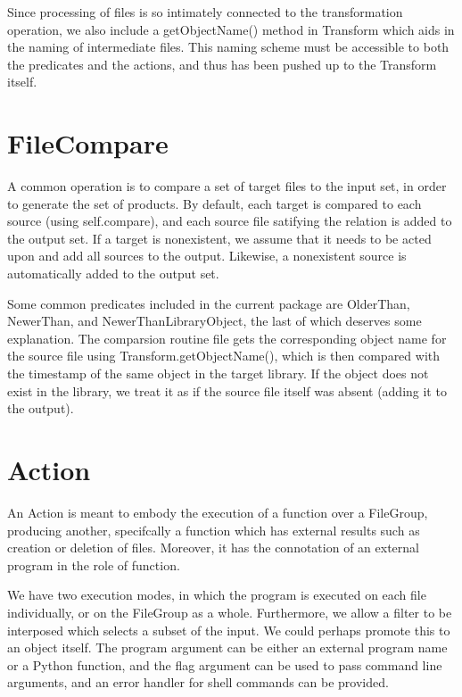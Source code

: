 Since processing of files is so intimately connected to the transformation operation, we also include a getObjectName()
method in Transform which aids in the naming of intermediate files. This naming scheme must be accessible to both the
predicates and the actions, and thus has been pushed up to the Transform itself.

\section{FileCompare}

A common operation is to compare a set of target files to the input set, in order to generate the set of products. By
default, each target is compared to each source (using self.compare), and each source file satifying the relation is
added to the output set. If a target is nonexistent, we assume that it needs to be acted upon and add all sources to the
output. Likewise, a nonexistent source is automatically added to the output set.

Some common predicates included in the current package are OlderThan, NewerThan, and NewerThanLibraryObject, the last of
which deserves some explanation. The comparsion routine file gets the corresponding object name for the source file
using Transform.getObjectName(), which is then compared with the timestamp of the same object in the target library. If
the object does not exist in the library, we treat it as if the source file itself was absent (adding it to the output).

\section{Action}

An Action is meant to embody the execution of a function over a FileGroup, producing another, specifcally a function
which has external results such as creation or deletion of files. Moreover, it has the connotation of an external
program in the role of function.

We have two execution modes, in which the program is executed on each file individually, or on the FileGroup as a
whole. Furthermore, we allow a filter to be interposed which selects a subset of the input. We could perhaps promote
this to an object itself. The program argument can be either an external program name or a Python function, and the flag
argument can be used to pass command line arguments, and an error handler for shell commands can be provided.

